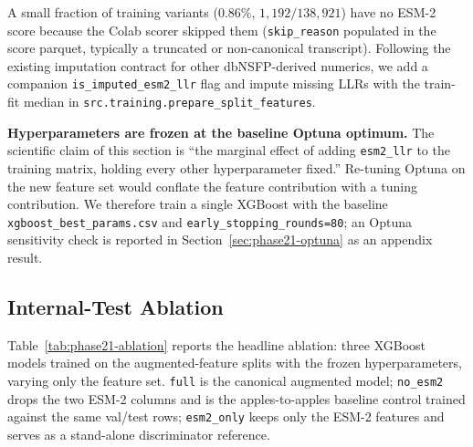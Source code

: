 \documentclass[11pt,a4paper,oneside]{report}
\begin{document}
A small fraction of training variants (0.86\%, $1{,}192/138{,}921$)
have no ESM-2 score because the Colab scorer skipped them
(\texttt{skip\_reason} populated in the score parquet, typically a
truncated or non-canonical transcript). Following the existing
imputation contract for other dbNSFP-derived numerics, we add a
companion \texttt{is\_imputed\_esm2\_llr} flag and impute missing
LLRs with the train-fit median in
\texttt{src.training.prepare\_split\_features}.

\textbf{Hyperparameters are frozen at the baseline Optuna optimum.}
The scientific claim of this section is ``the marginal effect of
adding \texttt{esm2\_llr} to the training matrix, holding every
other hyperparameter fixed.'' Re-tuning Optuna on the new feature
set would conflate the feature contribution with a tuning
contribution. We therefore train a single XGBoost with the
baseline \texttt{xgboost\_best\_params.csv} and
\texttt{early\_stopping\_rounds=80}; an Optuna sensitivity check
is reported in Section~\ref{sec:phase21-optuna} as an appendix
result.

\subsection{Internal-Test Ablation}
\label{sec:phase21-ablation}

Table~\ref{tab:phase21-ablation} reports the headline ablation:
three XGBoost models trained on the augmented-feature splits with the
frozen hyperparameters, varying only the feature set.
\texttt{full} is the canonical augmented model; \texttt{no\_esm2}
drops the two ESM-2 columns and is the apples-to-apples baseline
control trained against the same val/test rows; \texttt{esm2\_only}
keeps only the ESM-2 features and serves as a stand-alone
discriminator reference.
\end{document}
